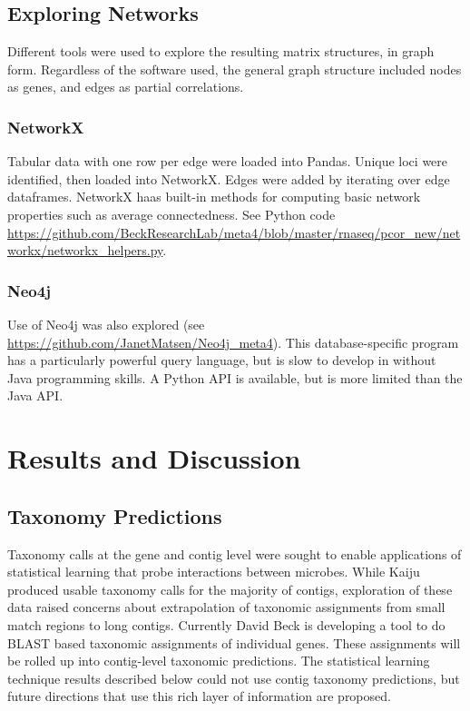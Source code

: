 \subsection{Exploring Networks}
Different tools were used to explore the resulting matrix structures, in graph form.
Regardless of the software used, the general graph structure included nodes as genes, and edges as partial correlations.

\subsubsection{NetworkX}
Tabular data with one row per edge were loaded into Pandas.
Unique loci were identified, then loaded into NetworkX.
Edges were added by iterating over edge dataframes.
NetworkX haas built-in methods for computing basic network properties such as average connectedness.
See Python code \url{https://github.com/BeckResearchLab/meta4/blob/master/rnaseq/pcor_new/networkx/networkx_helpers.py}.

\subsubsection{Neo4j}
Use of Neo4j was also explored (see \url{https://github.com/JanetMatsen/Neo4j_meta4}).
This database-specific program has a particularly powerful query language, but is slow to develop in without Java programming skills.
A Python API is available, but is more limited than the Java API.


\section{Results and Discussion}

\subsection{Taxonomy Predictions}
\label{results:taxonomy}
Taxonomy calls at the gene and contig level were sought to enable applications of statistical learning that probe interactions between microbes.
While Kaiju produced usable taxonomy calls for the majority of contigs, exploration of these data raised concerns about extrapolation of taxonomic assignments from small match regions to long contigs. %
Currently David Beck is developing a tool to do BLAST based taxonomic assignments of individual genes.
These assignments will be rolled up into contig-level taxonomic predictions.
The statistical learning technique results described below could not use contig taxonomy predictions, but future directions that use this rich layer of information are proposed.

